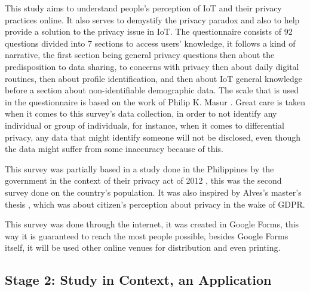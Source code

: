 \documentclass[manuscript,screen,review,natbib=false]{acmart}
\begin{document}
This study aims to understand people's perception of IoT and their privacy
practices online. It also serves to demystify the privacy paradox and also
to help provide a solution to the privacy issue in IoT. The questionnaire
consists of 92 questions divided into 7 sections to access users' knowledge,
it follows a kind of narrative, the first section being general privacy
questions then about the predisposition to data sharing, to concerns with
privacy then about daily digital routines, then about profile identification,
and then about IoT general knowledge before a section about non-identifiable
demographic data. The scale that is used in the questionnaire is based on
the work of Philip K. Masur \cite{masur2018situational}. Great care is taken
when it comes to this survey's data collection, in order to not identify
any individual or group of individuals, for instance, when it comes to differential
privacy, any data that might identify someone will not be disclosed, even
though the data might suffer from some inaccuracy because of this.

This survey was partially based in a study done in the Philippines by the
government in the context of their privacy act of 2012 \cite{Philippine2022Conduct},
this was the second survey done on the country's population. It was also
inspired by Alves's master's thesis \cite{Alves2021}, which was about citizen's
perception about privacy in the wake of GDPR.

This survey was done through the internet, it was created in Google Forms,
this way it is guaranteed to reach the most people possible, besides Google
Forms itself, it will be used other online venues for distribution and even
printing.

\subsection{Stage 2: Study in Context, an Application}
\end{document}
